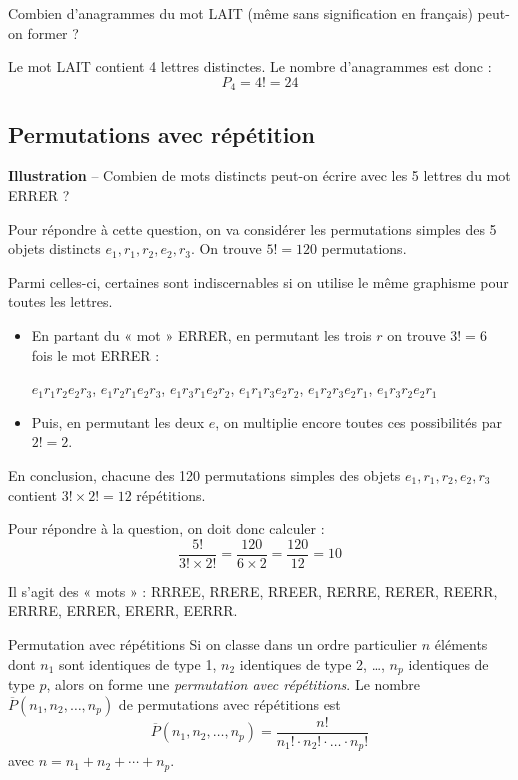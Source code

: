 \documentclass[a4paper,12pt]{article}
\begin{document}
\begin{exemple}
	\tcblower
	Combien d'anagrammes du mot LAIT (même sans signification en français) peut-on former ?

	Le mot LAIT contient 4 lettres distinctes. Le nombre d'anagrammes est donc :
	\[P_4 = 4! = 24\]
\end{exemple}

\subsection{Permutations avec répétition}

\begin{exemple}
	\tcblower
	{\bfseries Illustration} -- Combien de mots distincts peut-on écrire avec les 5 lettres du mot ERRER ?

	Pour répondre à cette question, on va considérer les permutations simples des 5 objets distincts $e_1, r_1, r_2, e_2, r_3$. On trouve $5! = 120$ permutations.

	Parmi celles-ci, certaines sont indiscernables si on utilise le même graphisme pour toutes les lettres.

	\begin{itemize}
		\item En partant du « mot » ERRER, en permutant les trois $r$ on trouve $3! = 6$ fois le mot ERRER :
		\begin{center}
		$e_1r_1r_2e_2r_3$, $e_1r_2r_1e_2r_3$, $e_1r_3r_1e_2r_2$, $e_1r_1r_3e_2r_2$, $e_1r_2r_3e_2r_1$, $e_1r_3r_2e_2r_1$
		\end{center}
		
		\item Puis, en permutant les deux $e$, on multiplie encore toutes ces possibilités par $2! = 2$.
	\end{itemize}

	En conclusion, chacune des 120 permutations simples des objets $e_1, r_1, r_2, e_2, r_3$ contient $3! \times 2! = 12$ répétitions.

	Pour répondre à la question, on doit donc calculer :
	\[\frac{5!}{3! \times 2!} = \frac{120}{6 \times 2} = \frac{120}{12} = 10\]

	Il s'agit des « mots » : RRREE, RRERE, RREER, RERRE, RERER, REERR, ERRRE, ERRER, ERERR, EERRR.
\end{exemple}

\begin{definition}
	Permutation avec répétitions
	\tcblower
	Si on classe dans un ordre particulier $n$ éléments dont $n_1$ sont identiques de type 1, $n_2$ identiques de type 2, \ldots, $n_p$ identiques de type $p$, alors on forme une \emph{permutation avec répétitions}. Le nombre $\overline{P}(n_1, n_2, \ldots, n_p)$ de permutations avec répétitions est
	\[\overline{P}(n_1, n_2, \ldots, n_p) = \frac{n!}{n_1! \cdot n_2! \cdot \ldots \cdot n_p!}\]
	avec $n = n_1 + n_2 + \cdots + n_p$.
\end{definition}
\end{document}
